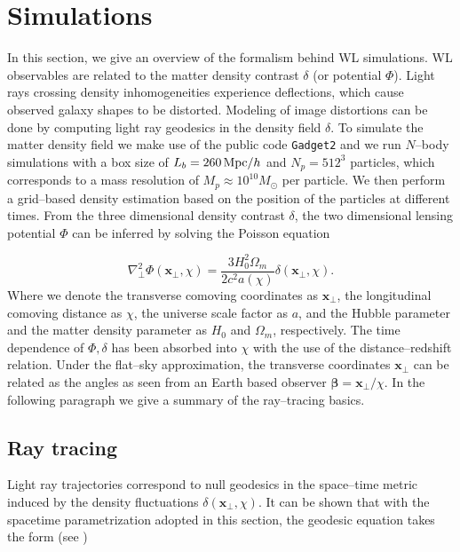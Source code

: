 \documentclass[reprint,aps,prd,superscriptaddress,showkeys,showpacs]{revtex4-1}
\newcommand{\bb}[1]{\mathbf{#1}}
\newcommand{\ttt}[1]{\texttt{#1}}
\begin{document}

\section{Simulations}
\label{sec:sims}
% 
In this section, we give an overview of the formalism behind WL simulations. WL observables are related to the matter density contrast $\delta$ (or potential $\Phi$). Light rays crossing density inhomogeneities experience deflections, which cause observed galaxy shapes to be distorted. Modeling of image distortions can be done by computing light ray geodesics in the density field $\delta$. To simulate the matter density field we make use of the public code \ttt{Gadget2} \citep{Gadget2} and we run $N$--body simulations with a box size of $L_b=260\,{\rm Mpc}/h$ and $N_p=512^3$ particles, which corresponds to a mass resolution of $M_p\approx 10^{10}M_\odot$ per particle. We then perform a grid--based density estimation based on the position of the particles at different times. From the three dimensional density contrast $\delta$, the two dimensional lensing potential $\Phi$ can be inferred by solving the Poisson equation

\begin{equation}
\label{sim:poisson}
\nabla_\perp^2\Phi(\bb{x}_\perp,\chi) = \frac{3H_0^2\Omega_m}{2c^2a(\chi)} \delta(\bb{x}_\perp,\chi).
\end{equation} 
%
Where we denote the transverse comoving coordinates as $\bb{x}_\perp$, the longitudinal comoving distance as $\chi$, the universe scale factor as $a$, and the Hubble parameter and the matter density parameter as  $H_0$ and $\Omega_m$, respectively. The time dependence of $\Phi,\delta$ has been absorbed into $\chi$ with the use of the distance--redshift relation. Under the flat--sky approximation, the transverse coordinates $\bb{x}_\perp$ can be related as the angles as seen from an Earth based observer $\pmb{\beta}=\bb{x}_\perp/\chi$. In the following paragraph we give a summary of the ray--tracing basics.   

\subsection{Ray tracing}
Light ray trajectories correspond to null geodesics in the space--time metric induced by the density fluctuations $\delta(\bb{x}_\perp,\chi)$. It can be shown that with the spacetime parametrization adopted in this section, the geodesic equation takes the form (see \citep{BornFlexion})
\end{document}
